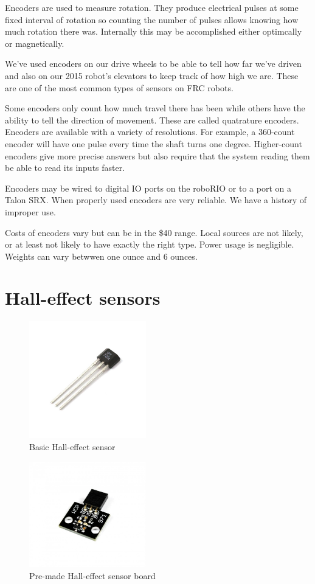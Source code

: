\documentclass{article}
\begin{document}
Encoders are used to measure rotation.  They produce electrical pulses at some fixed interval of rotation so counting the number of pulses allows knowing how much rotation there was.  Internally this may be accomplished either optimcally or magnetically.  

We've used encoders on our drive wheels to be able to tell how far we've driven and also on our 2015 robot's elevators to keep track of how high we are.  These are one of the most common types of sensors on FRC robots.

Some encoders only count how much travel there has been while others have the ability to tell the direction of movement.  These are called quatrature encoders.  Encoders are available with a variety of resolutions.  For example, a 360-count encoder will have one pulse every time the shaft turns one degree.  Higher-count encoders give more precise answers but also require that the system reading them be able to read its inputs faster.  

Encoders may be wired to digital IO ports on the roboRIO or to a port on a Talon SRX.  When properly used encoders are very reliable.  We have a history of improper use.  

Costs of encoders vary but can be in the \$40 range.  Local sources are not likely, or at least not likely to have exactly the right type.  Power usage is negligible.  Weights can vary betwwen one ounce and 6 ounces.  

\section{Hall-effect sensors}

\begin{figure}[ht]
\centering
\includegraphics[width=2in]{hall_effect.jpg}
\caption{Basic Hall-effect sensor}
\end{figure}

\begin{figure}[ht]
\centering
\includegraphics[width=2in]{hall-effect-sensor-board.jpg}
\caption{Pre-made Hall-effect sensor board}
\end{figure}
\end{document}
